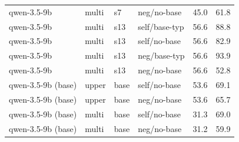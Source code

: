 {\begin{longtable}{llll rr}
qwen-3.5-9b & multi & s7 & neg/no-base & 45.0 & 61.8 \\
qwen-3.5-9b & multi & s13 & self/base-typ & 56.6 & 88.8 \\
qwen-3.5-9b & multi & s13 & self/no-base & 56.6 & 82.9 \\
qwen-3.5-9b & multi & s13 & neg/base-typ & 56.6 & 93.9 \\
qwen-3.5-9b & multi & s13 & neg/no-base & 56.6 & 52.8 \\
\midrule
qwen-3.5-9b (base) & upper & base & self/no-base & 53.6 & 69.1 \\
qwen-3.5-9b (base) & upper & base & neg/no-base & 53.6 & 65.7 \\
\midrule
qwen-3.5-9b (base) & multi & base & self/no-base & 31.3 & 69.0 \\
qwen-3.5-9b (base) & multi & base & neg/no-base & 31.2 & 59.9 \\
\bottomrule
\end{longtable}
}
